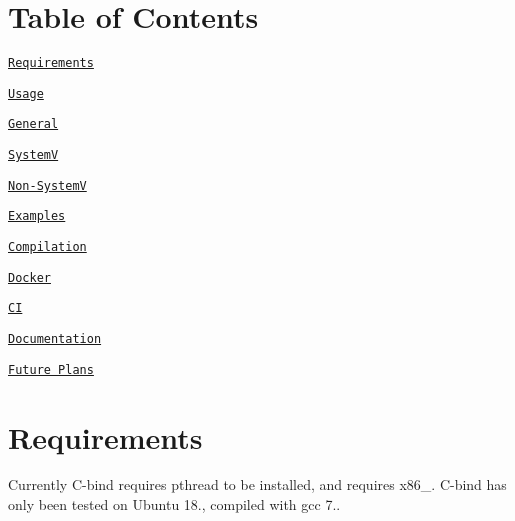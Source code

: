 \href{https://travis-ci.org/zwimer/C-bind}{\tt }

\section*{Table of Contents}


\begin{DoxyEnumerate}
\item \href{#requirements}{\tt Requirements}
\end{DoxyEnumerate}
\begin{DoxyEnumerate}
\item \href{#usage}{\tt Usage}
\begin{DoxyItemize}
\item \href{#general}{\tt General}
\item \href{#systemv}{\tt SystemV}
\item \href{#non-systemv}{\tt Non-\/\+SystemV}
\end{DoxyItemize}
\end{DoxyEnumerate}
\begin{DoxyEnumerate}
\item \href{#examples}{\tt Examples}
\end{DoxyEnumerate}
\begin{DoxyEnumerate}
\item \href{#compilation}{\tt Compilation}
\end{DoxyEnumerate}
\begin{DoxyEnumerate}
\item \href{#docker}{\tt Docker}
\end{DoxyEnumerate}
\begin{DoxyEnumerate}
\item \href{#ci}{\tt CI}
\end{DoxyEnumerate}
\begin{DoxyEnumerate}
\item \href{#documentation}{\tt Documentation}
\end{DoxyEnumerate}
\begin{DoxyEnumerate}
\item \href{#future-plans}{\tt Future Plans} 


\end{DoxyEnumerate}

\section*{Requirements}

Currently {\ttfamily C-\/bind} requires {\ttfamily pthread} to be installed, and requires {\ttfamily x86\+\_}. {\ttfamily C-\/bind} has only been tested on {\ttfamily Ubuntu 18.}, compiled with {\ttfamily gcc 7.}.

